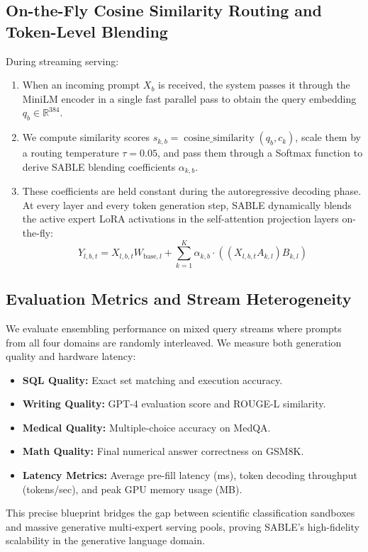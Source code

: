 \documentclass{article}
\theoremstyle{plain}
\theoremstyle{definition}
\theoremstyle{remark}
\begin{document}
\subsection{On-the-Fly Cosine Similarity Routing and Token-Level Blending}
During streaming serving:
\begin{enumerate}
    \item When an incoming prompt $X_b$ is received, the system passes it through the MiniLM encoder in a single fast parallel pass to obtain the query embedding $q_b \in \mathbb{R}^{384}$.
    \item We compute similarity scores $s_{k, b} = \operatorname{cosine\_similarity}(q_b, c_k)$, scale them by a routing temperature $\tau = 0.05$, and pass them through a Softmax function to derive SABLE blending coefficients $\alpha_{k, b}$.
    \item These coefficients are held constant during the autoregressive decoding phase. At every layer and every token generation step, SABLE dynamically blends the active expert LoRA activations in the self-attention projection layers on-the-fly:
    \begin{equation}
    Y_{l, b, t} = X_{l, b, t} W_{\text{base}, l} + \sum_{k=1}^K \alpha_{k, b} \cdot \left( (X_{l, b, t} A_{k, l}) B_{k, l} \right)
    \end{equation}
\end{enumerate}

\subsection{Evaluation Metrics and Stream Heterogeneity}
We evaluate ensembling performance on mixed query streams where prompts from all four domains are randomly interleaved. We measure both generation quality and hardware latency:
\begin{itemize}
    \item \textbf{SQL Quality:} Exact set matching and execution accuracy.
    \item \textbf{Writing Quality:} GPT-4 evaluation score and ROUGE-L similarity.
    \item \textbf{Medical Quality:} Multiple-choice accuracy on MedQA.
    \item \textbf{Math Quality:} Final numerical answer correctness on GSM8K.
    \item \textbf{Latency Metrics:} Average pre-fill latency (ms), token decoding throughput (tokens/sec), and peak GPU memory usage (MB).
\end{itemize}
This precise blueprint bridges the gap between scientific classification sandboxes and massive generative multi-expert serving pools, proving SABLE's high-fidelity scalability in the generative language domain.
\end{document}
